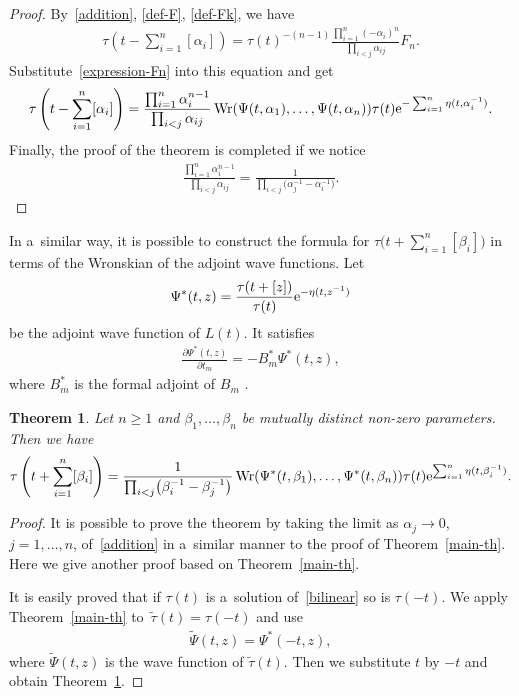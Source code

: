 \documentclass[pdftex]{sigma}
\numberwithin{equation}{section}
\newtheorem{Theorem}{Theorem}[section]
\theoremstyle{definition}
\begin{document}
\begin{proof}
By~\eqref{addition}, \eqref{def-F}, \eqref{def-Fk}, we have
\begin{gather*}
\tau\left(t-\sum_{i=1}^n[\alpha_i]\right)
=
\tau(t)^{-(n-1)}\frac{\prod_{i=1}^n (-\alpha_i)^n}{\prod_{i<j}\alpha_{ij}}F_n.
\end{gather*}
Substitute~\eqref{expression-Fn} into this equation and get
\begin{gather*}
\tau\left(t-\sum_{i=1}^n[\alpha_i]\right)
=
\frac{\prod_{i=1}^{n}\alpha_i^{n-1}}{\prod_{i<j}\alpha_{ij}}
\operatorname{Wr}(\Psi(t,\alpha_1),\dots ,\Psi(t,\alpha_n))\tau(t)
{\rm e}^{-\sum_{i=1}^n\eta(t,\alpha_i^{-1})}.
\nonumber
\end{gather*}
Finally, the proof of the theorem is completed if we notice
\begin{gather*}
\frac{\prod_{i=1}^{n}\alpha_i^{n-1}}{\prod_{i<j}\alpha_{ij}}
=
\frac{1}{\prod_{i<j}\bigl(\alpha_j^{-1}-\alpha_i^{-1}\bigr)}.\tag*{\qed}
\end{gather*} \renewcommand{\qed}{}
\end{proof}

In a~similar way, it is possible to construct the formula for
 $\tau\bigl(t+\sum_{i=1}^n[\beta_i]\bigr)$ in terms of the
Wronskian of the adjoint wave functions. Let
\begin{gather*}
\Psi^\ast(t,z)=\frac{\tau(t+[z])}{\tau(t)}{\rm e}^{-\eta(t,z^{-1})}
\end{gather*}
be the adjoint wave function of $L(t)$. It satisfies
\begin{gather*}
\frac{\partial \Psi^\ast(t,z)}{\partial t_m}=-B_m^\ast \Psi^\ast(t,z),
\end{gather*}
where $B_m^\ast$ is the formal adjoint of $B_m$ \cite{DJKM}.



\begin{Theorem}\label{main-th-2}
Let $n\geq 1$ and $\beta_1,\dots ,\beta_n$ be mutually distinct non-zero parameters.
 Then we have
\begin{gather*}
\tau\left(t+\sum_{i=1}^n[\beta_i]\right)=\frac{1}{\prod_{i<j}\bigl(\beta_i^{-1}-\beta_j^{-1}\bigr)}
\operatorname{Wr}(\Psi^\ast(t,\beta_1),\dots ,\Psi^\ast(t,\beta_n))\tau(t){\rm e}^{\sum_{i=1}^n\eta(t,\beta_i^{-1})}.
\end{gather*}
\end{Theorem}


\begin{proof} It is possible to prove the theorem by taking the limit as $\alpha_j\to 0$, $j=1,\dots ,n$, of~\eqref{addition} in a~similar manner to the proof of Theorem~\ref{main-th}.
Here we give another proof based on Theorem~\ref{main-th}.

It is easily proved that if $\tau(t)$ is a~solution of~\eqref{bilinear} so is $\tau(-t)$.
We apply Theorem~\ref{main-th} to~${\tilde{\tau}(t)=\tau(-t)}$ and use
\begin{gather}
\tilde{\Psi}(t,z)=\Psi^\ast(-t,z),
\label{tilde-psi-trf}
\end{gather}
where $\tilde{\Psi}(t,z)$ is the wave function of $\tilde{\tau}(t)$.
Then we substitute $t$ by $-t$ and obtain Theorem~\ref{main-th-2}.
\end{proof}
\end{document}

